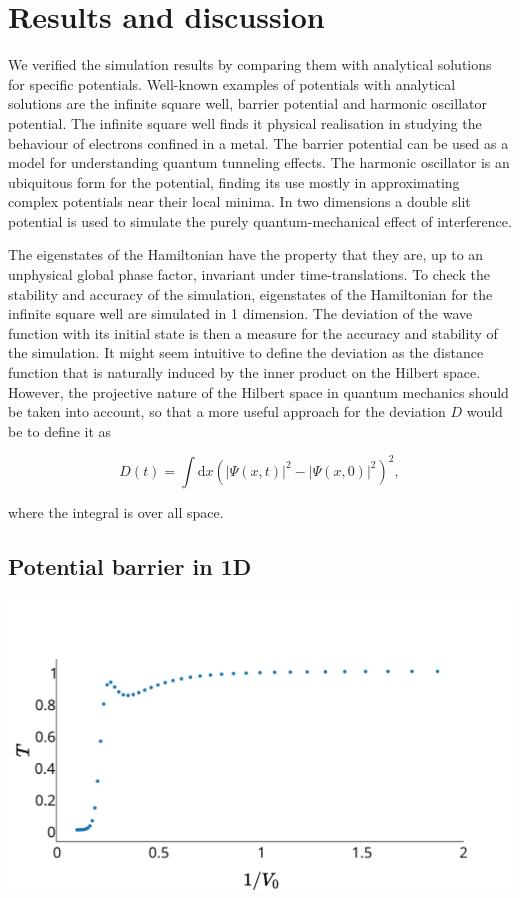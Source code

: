\section*{Results and discussion}
We verified the simulation results by comparing them with analytical solutions for specific potentials. Well-known examples of potentials with analytical solutions are the infinite square well, barrier potential and harmonic oscillator potential.
The infinite square well finds it physical realisation in studying the behaviour of electrons confined in a metal. The barrier potential can be used as a model for understanding quantum tunneling effects. The harmonic oscillator is an ubiquitous form for the potential, finding its use mostly in approximating complex potentials near their local minima.
In two dimensions a double slit potential is used to simulate the purely quantum-mechanical effect of interference.


The eigenstates of the Hamiltonian have the property that they are, up to an unphysical global phase factor, invariant under time-translations. To check the stability and accuracy of the simulation, eigenstates of the Hamiltonian for the infinite square well are simulated in 1 dimension. The deviation of the wave function with its initial state is then a measure for the accuracy and stability of the simulation. It might seem intuitive to define the deviation as the distance function that is naturally induced by the inner product on the Hilbert space. However, the projective nature of the Hilbert space in quantum mechanics should be taken into account, so that a more useful approach for the deviation $D$ would be to define it as

\[
D(t) = \int\mathrm{d}x\left(|\Psi(x,t)|^2-|\Psi(x,0)|^2\right)^2,
\]

where the integral is over all space. 

\subsection*{Potential barrier in 1D}
\begin{Figure}
    \centering
    \includegraphics[width=\linewidth]{transmission_1d_pot_barrier.pdf}
    \label{fig:transmission}
\end{Figure}

\subsection*{}